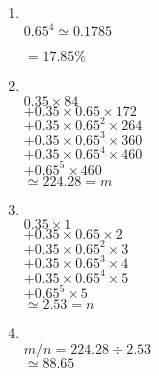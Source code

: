 \documentclass[10pt, a4paper]{article}
\begin{document}
\begin{enumerate}
\begin{enumerate}
    \item\mbox{}\\
        $0.65^4 \simeq 0.1785$

        $= 17.85 \%$
    \item\mbox{}\\
        $0.35 \times 84$\\
        $+ 0.35 \times 0.65 \times 172$\\
        $+ 0.35 \times 0.65^2 \times 264$\\
        $+ 0.35 \times 0.65^3 \times 360$\\
        $+ 0.35 \times 0.65^4 \times 460$\\
        $+ 0.65^5 \times 460$\\
        $\simeq 224.28 = m$
    \item\mbox{}\\
        $0.35 \times 1$\\
        $+ 0.35 \times 0.65 \times 2$\\
        $+ 0.35 \times 0.65^2 \times 3$\\
        $+ 0.35 \times 0.65^3 \times 4$\\
        $+ 0.35 \times 0.65^4 \times 5$\\
        $+ 0.65^5 \times 5$\\
        $\simeq 2.53 = n$
    \item\mbox{}\\
        $m / n = 224.28 \div 2.53$\\
        $\simeq 88.65$

    \end{enumerate}


\end{enumerate}
\end{document}
